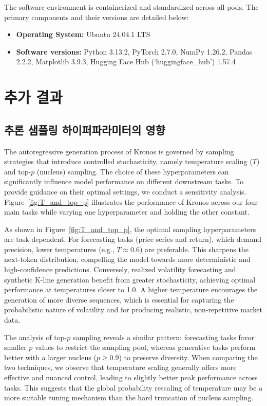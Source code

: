 The software environment is containerized and standardized across all pods. The primary components and their versions are detailed below:
\begin{itemize}
    \item \textbf{Operating System:} Ubuntu 24.04.1 LTS
    \item \textbf{Software versions:} Python 3.13.2, PyTorch 2.7.0, NumPy 1.26.2, Pandas 2.2.2, Matplotlib 3.9.3, Hugging Face Hub (`huggingface\_hub') 1.57.4
\end{itemize}


\section{추가 결과}

\subsection{추론 샘플링 하이퍼파라미터의 영향}
\label{sec:sampling_hyperparams}

The autoregressive generation process of Kronos is governed by sampling strategies that introduce controlled stochasticity, namely temperature scaling ($T$) and top-$p$ (nucleus) sampling. The choice of these hyperparameters can significantly influence model performance on different downstream tasks. To provide guidance on their optimal settings, we conduct a sensitivity analysis. Figure~\ref{fig:T_and_top_p} illustrates the performance of Kronos across our four main tasks while varying one hyperparameter and holding the other constant.

As shown in Figure~\ref{fig:T_and_top_p}, the optimal sampling hyperparameters are task-dependent. For forecasting tasks (price series and return), which demand precision, lower temperatures (e.g., $T \approx 0.6$) are preferable. This sharpens the next-token distribution, compelling the model towards more deterministic and high-confidence predictions. Conversely, realized volatility forecasting and synthetic K-line generation benefit from greater stochasticity, achieving optimal performance at temperatures closer to 1.0. A higher temperature encourages the generation of more diverse sequences, which is essential for capturing the probabilistic nature of volatility and for producing realistic, non-repetitive market data.

The analysis of top-$p$ sampling reveals a similar pattern: forecasting tasks favor smaller $p$ values to restrict the sampling pool, whereas generative tasks perform better with a larger nucleus ($p \ge 0.9$) to preserve diversity. When comparing the two techniques, we observe that temperature scaling generally offers more effective and nuanced control, leading to slightly better peak performance across tasks. This suggests that the global probability rescaling of temperature may be a more suitable tuning mechanism than the hard truncation of nucleus sampling.

